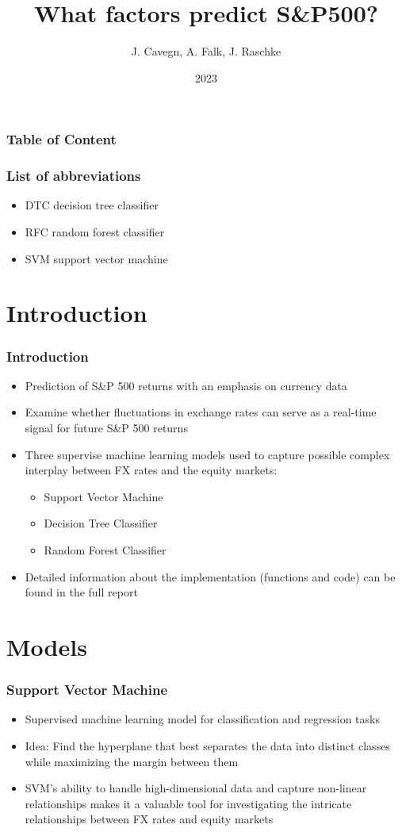\documentclass{beamer}
\title{\bfseries What factors predict S\&P500?}
\author{J. Cavegn, A. Falk, J. Raschke}
\institute{UZH, Department of Banking and Finance}
\date{2023}
\begin{document}
\frame{\titlepage}

\begin{frame}
\frametitle{Table of Content}
\tableofcontents
\end{frame}

\begin{frame}
\frametitle{List of abbreviations}
\begin{itemize}
    \item DTC   decision tree classifier
    \item RFC   random forest classifier
    \item SVM   support vector machine
\end{itemize}
    
\end{frame}

\section{Introduction}
\begin{frame}
\frametitle{Introduction}
\begin{itemize}
\item Prediction of S\&P 500 returns with an emphasis on currency data
\item Examine whether fluctuations in exchange rates can serve as a real-time signal for future S\&P 500 returns
\item Three supervise machine learning models used to capture possible complex interplay between FX rates and the equity markets:
\begin{itemize}
\item Support Vector Machine
\item Decision Tree Classifier 
\item Random Forest Classifier
\end{itemize}
\item Detailed information about the implementation (functions and code) can be found in the full report
\end{itemize}
\end{frame}


\section{Models}
\begin{frame}
\frametitle{Support Vector Machine}
\begin{itemize}
\item Supervised machine learning model for classification and regression tasks
\item Idea: Find the hyperplane that best separates the data into distinct classes while maximizing the margin between them
\item SVM's ability to handle high-dimensional data and capture non-linear relationships makes it a valuable tool for investigating the intricate relationships between FX rates and equity markets
\end{itemize}
\end{frame}
\end{document}
